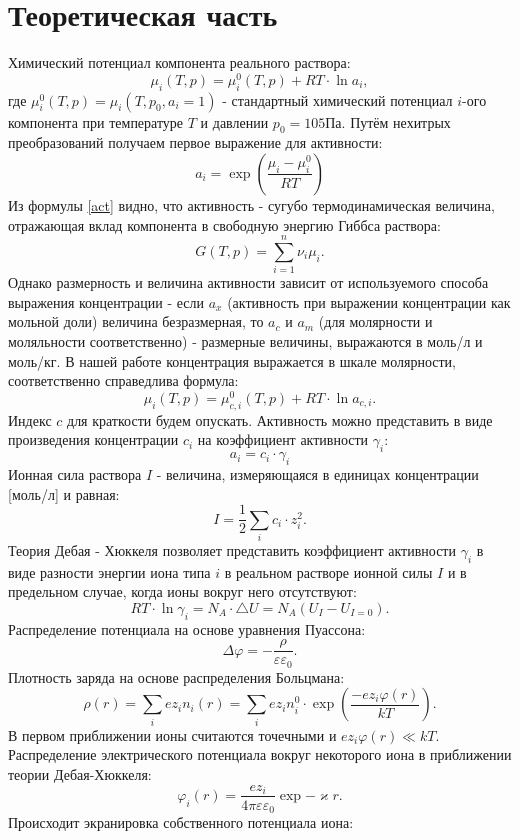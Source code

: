 \documentclass[a4paper, 12pt]{article}
\begin{document}
\section{Теоретическая часть}
Химический потенциал компонента реального раствора: 
\[\mu_i(T, p) = \mu_i^0(T, p)+RT\cdot \ln{a_i},\]
где $\mu_i^0(T, p) = \mu_i(T, p_0, a_i = 1)$ - стандартный химический потенциал $i$-ого компонента при температуре $T$ и давлении $p_0 = 105\text{Па}.$ Путём нехитрых преобразований получаем первое выражение для активности:
\begin{equation} \label{act}
a_i = \exp{\left(\frac{\mu_i-\mu_i^0}{RT}\right)}
\end{equation}
Из формулы \ref{act} видно, что активность - сугубо термодинамическая величина, отражающая вклад компонента в свободную энергию Гиббса раствора: 
\[G(T, p) = \sum_{i=1}^n {\nu_i \mu_i}.\] 
Однако размерность и величина активности зависит от используемого способа выражения концентрации - если $a_x$ (активность при выражении концентрации как мольной доли) величина безразмерная, то $a_c$ и $a_m$ (для молярности и моляльности соответственно) - размерные величины, выражаются в моль/л и моль/кг. В
нашей работе концентрация выражается в шкале молярности, соответственно справедлива формула: 
\[\mu_i(T, p) = \mu_{c,i}^0(T, p) + RT \cdot \ln{a_{c,i}}.\]
Индекс $c$ для краткости будем опускать. Активность можно
представить в виде произведения концентрации $c_i$ на коэффициент активности $\gamma_i$:
\begin{equation}
a_i = c_i \cdot \gamma_i
\end{equation}
Ионная сила раствора $I$ - величина, измеряющаяся в единицах концентрации [моль/л] и равная: 
\[I = \frac{1}{2}\sum_i {c_i \cdot z_i^2}.\]
Теория Дебая - Хюккеля позволяет представить коэффициент активности $\gamma_i$ в виде
разности энергии иона типа $i$ в реальном растворе ионной силы $I$ и в предельном случае, когда
ионы вокруг него отсутствуют: 
\[RT \cdot \ln{\gamma_i} = N_A \cdot \bigtriangleup U = N_A(U_I - U_{I=0}).\]
Распределение потенциала
на основе уравнения Пуассона: 
\[\Delta \varphi = - \frac{\rho}{\varepsilon\varepsilon_0} .\]
Плотность заряда на основе распределения Больцмана:
\[\rho(r) =\sum_i{e z_i n_i(r)} = \sum_i{e z_i n_i^0\cdot \exp{\left(\frac{-ez_i\varphi(r)}
{kT}\right)}} .\] 
В первом приближении ионы считаются точечными
и $ez_i\varphi (r) \ll kT$. Распределение электрического потенциала вокруг некоторого иона в приближении
теории Дебая-Хюккеля: 
\[\varphi_i(r) =\frac{ez_i}{4 \pi \varepsilon \varepsilon_0} \exp{-\varkappa   r}.\]
Происходит экранировка собственного потенциала иона:
\end{document}
